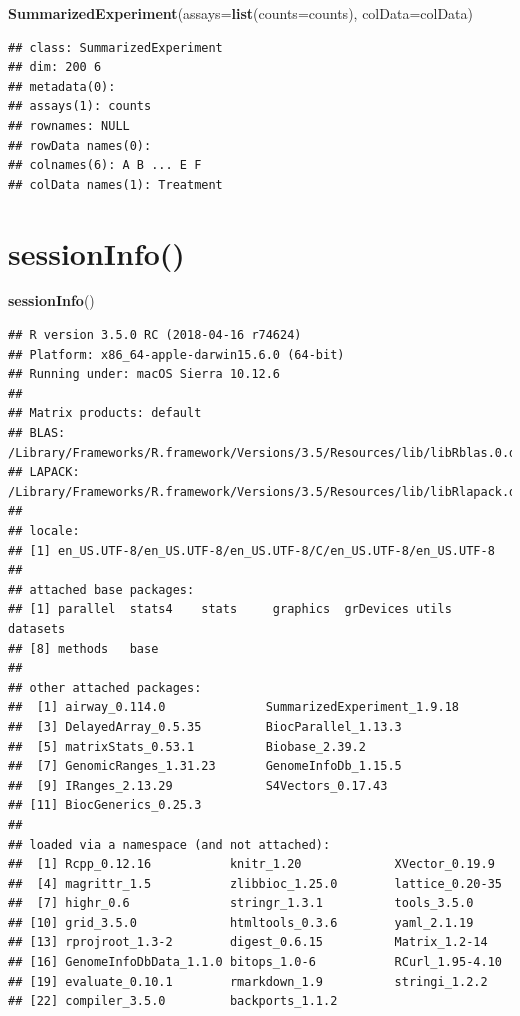 \documentclass[]{article}
\newenvironment{Shaded}{\begin{snugshade}}{\end{snugshade}}
\newcommand{\DataTypeTok}[1]{\textcolor[rgb]{0.13,0.29,0.53}{#1}}
\newcommand{\KeywordTok}[1]{\textcolor[rgb]{0.13,0.29,0.53}{\textbf{#1}}}
\newcommand{\NormalTok}[1]{#1}
\begin{document}
\begin{Shaded}
\begin{Highlighting}[]
\KeywordTok{SummarizedExperiment}\NormalTok{(}\DataTypeTok{assays=}\KeywordTok{list}\NormalTok{(}\DataTypeTok{counts=}\NormalTok{counts), }\DataTypeTok{colData=}\NormalTok{colData)}
\end{Highlighting}
\end{Shaded}

\begin{verbatim}
## class: SummarizedExperiment 
## dim: 200 6 
## metadata(0):
## assays(1): counts
## rownames: NULL
## rowData names(0):
## colnames(6): A B ... E F
## colData names(1): Treatment
\end{verbatim}

\hypertarget{sessioninfo}{%
\section{sessionInfo()}\label{sessioninfo}}

\begin{Shaded}
\begin{Highlighting}[]
\KeywordTok{sessionInfo}\NormalTok{()}
\end{Highlighting}
\end{Shaded}

\begin{verbatim}
## R version 3.5.0 RC (2018-04-16 r74624)
## Platform: x86_64-apple-darwin15.6.0 (64-bit)
## Running under: macOS Sierra 10.12.6
## 
## Matrix products: default
## BLAS: /Library/Frameworks/R.framework/Versions/3.5/Resources/lib/libRblas.0.dylib
## LAPACK: /Library/Frameworks/R.framework/Versions/3.5/Resources/lib/libRlapack.dylib
## 
## locale:
## [1] en_US.UTF-8/en_US.UTF-8/en_US.UTF-8/C/en_US.UTF-8/en_US.UTF-8
## 
## attached base packages:
## [1] parallel  stats4    stats     graphics  grDevices utils     datasets 
## [8] methods   base     
## 
## other attached packages:
##  [1] airway_0.114.0              SummarizedExperiment_1.9.18
##  [3] DelayedArray_0.5.35         BiocParallel_1.13.3        
##  [5] matrixStats_0.53.1          Biobase_2.39.2             
##  [7] GenomicRanges_1.31.23       GenomeInfoDb_1.15.5        
##  [9] IRanges_2.13.29             S4Vectors_0.17.43          
## [11] BiocGenerics_0.25.3        
## 
## loaded via a namespace (and not attached):
##  [1] Rcpp_0.12.16           knitr_1.20             XVector_0.19.9        
##  [4] magrittr_1.5           zlibbioc_1.25.0        lattice_0.20-35       
##  [7] highr_0.6              stringr_1.3.1          tools_3.5.0           
## [10] grid_3.5.0             htmltools_0.3.6        yaml_2.1.19           
## [13] rprojroot_1.3-2        digest_0.6.15          Matrix_1.2-14         
## [16] GenomeInfoDbData_1.1.0 bitops_1.0-6           RCurl_1.95-4.10       
## [19] evaluate_0.10.1        rmarkdown_1.9          stringi_1.2.2         
## [22] compiler_3.5.0         backports_1.1.2
\end{verbatim}
\end{document}
